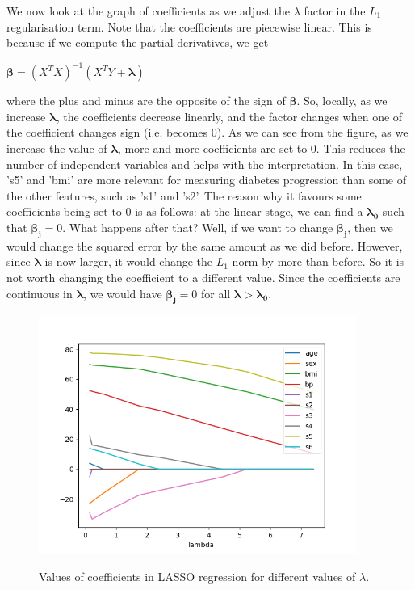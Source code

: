 \documentclass[11pt,a4paper]{article}
\begin{document}
We now look at the graph of coefficients as we adjust the $\lambda$ factor in the $L_1$ regularisation term. Note that the coefficients are piecewise linear. This is because if we compute the partial derivatives, we get
\begin{center} $\mathbf{\beta} = (X^TX)^{-1} (X^TY \mp \mathbf{\lambda})$ \end{center}
where the plus and minus are the opposite of the sign of $\mathbf{\beta}$. So, locally, as we increase $\mathbf{\lambda}$, the coefficients decrease linearly, and the factor changes when one of the coefficient changes sign (i.e. becomes 0). As we can see from the figure, as we increase the value of $\mathbf{\lambda}$, more and more coefficients are set to 0. This reduces the number of independent variables and helps with the interpretation. In this case, 's5' and 'bmi' are more relevant for measuring diabetes progression than some of the other features, such as 's1' and 's2'. The reason why it favours some coefficients being set to 0 is as follows: at the linear stage, we can find a $\mathbf{\lambda_0}$ such that $\mathbf{\beta_j} = 0$. What happens after that? Well, if we want to change $\mathbf{\beta_j}$, then we would change the squared error by the same amount as we did before. However, since $\mathbf{\lambda}$ is now larger, it would change the $L_1$ norm by more than before. So it is not worth changing the coefficient to a different value. Since the coefficients are continuous in $\mathbf{\lambda}$, we would have $\mathbf{\beta_j} = 0$ for all $\mathbf{\lambda} > \mathbf{\lambda_0}$. \\

\begin{figure}[htbp]\centering\label{fig1}
  \includegraphics[height=78mm,angle=0]{fig1.png}
  \caption{Values of coefficients in LASSO regression for different values of $\lambda$.}
\end{figure}
\end{document}
